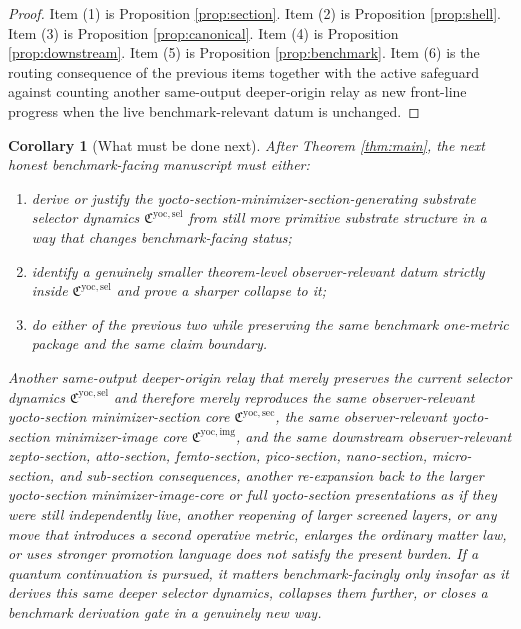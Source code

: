 \documentclass[11pt]{article}
\newcommand{\YoctoImageCore}{\mathfrak C^{\mathrm{yoc,img}}}
\newcommand{\YoctoMinSectionCore}{\mathfrak C^{\mathrm{yoc,sec}}}
\newcommand{\YoctoSelectorPackage}{\mathfrak C^{\mathrm{yoc,sel}}}
\newtheorem{corollary}{Corollary}
\begin{document}
\begin{proof}
Item (1) is Proposition \ref{prop:section}. Item (2) is Proposition \ref{prop:shell}. Item (3) is Proposition \ref{prop:canonical}. Item (4) is Proposition \ref{prop:downstream}. Item (5) is Proposition \ref{prop:benchmark}. Item (6) is the routing consequence of the previous items together with the active safeguard against counting another same-output deeper-origin relay as new front-line progress when the live benchmark-relevant datum is unchanged.
\end{proof}

\begin{corollary}[What must be done next]
\label{cor:next}
After Theorem \ref{thm:main}, the next honest benchmark-facing manuscript must either:
\begin{enumerate}
    \item derive or justify the yocto-section-minimizer-section-generating substrate selector dynamics \(\YoctoSelectorPackage\) from still more primitive substrate structure in a way that changes benchmark-facing status;
    \item identify a genuinely smaller theorem-level observer-relevant datum strictly inside \(\YoctoSelectorPackage\) and prove a sharper collapse to it;
    \item do either of the previous two while preserving the same benchmark one-metric package and the same claim boundary.
\end{enumerate}
Another same-output deeper-origin relay that merely preserves the current selector dynamics \(\YoctoSelectorPackage\) and therefore merely reproduces the same observer-relevant yocto-section minimizer-section core \(\YoctoMinSectionCore\), the same observer-relevant yocto-section minimizer-image core \(\YoctoImageCore\), and the same downstream observer-relevant zepto-section, atto-section, femto-section, pico-section, nano-section, micro-section, and sub-section consequences, another re-expansion back to the larger yocto-section minimizer-image-core or full yocto-section presentations as if they were still independently live, another reopening of larger screened layers, or any move that introduces a second operative metric, enlarges the ordinary matter law, or uses stronger promotion language does not satisfy the present burden. If a quantum continuation is pursued, it matters benchmark-facingly only insofar as it derives this same deeper selector dynamics, collapses them further, or closes a benchmark derivation gate in a genuinely new way.
\end{corollary}
\end{document}
